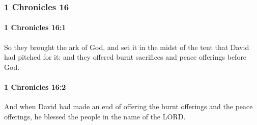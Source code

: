	\subsubsection{1 Chronicles 16} %
		\label{1CHRONICLES-16}

		\paragraph{1 Chronicles 16:1} %
			\label{1CHRONICLES-16-1}

			So they brought the ark of God, and set it in the midst of the tent that David had pitched for it: and they offered burnt sacrifices and peace offerings before God.


		\paragraph{1 Chronicles 16:2} %
			\label{1CHRONICLES-16-2}

			And when David had made an end of offering the burnt offerings and the peace offerings, he blessed the people in the name of the LORD.

